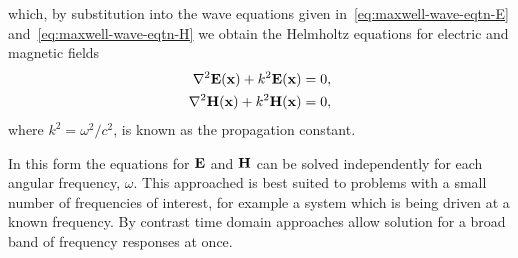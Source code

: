 which, by substitution into the wave equations given
in~\eqref{eq:maxwell-wave-eqtn-E} and~\eqref{eq:maxwell-wave-eqtn-H} we obtain
the Helmholtz equations for electric and magnetic fields
\begin{align}
  \label{eq:helmholtz}
  \nabla^2 \mathbf{E}(\mathbf{x}) + k^2 \mathbf{E}(\mathbf{x}) = 0, \\
  \nabla^2 \mathbf{H}(\mathbf{x}) + k^2 \mathbf{H}(\mathbf{x}) = 0,
\end{align}
where $k^2 =\omega^2/c^2$, is known as the propagation constant.

In this form the equations for $\mathbf{E}$ and $\mathbf{H}$ can be solved independently for
each angular frequency, $\omega$. This approached is best suited
to problems with a small number of frequencies of interest, for example a system
which is being driven at a known frequency. By contrast time domain approaches
allow solution for a broad band of frequency responses at once.




